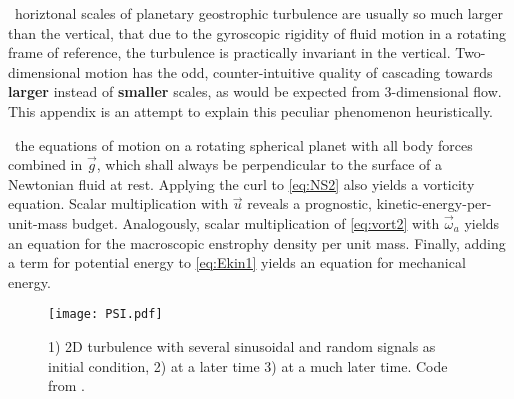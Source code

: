 \label{chap:turbu_categories}
~horiztonal scales of planetary geostrophic turbulence are usually so much
larger than the vertical, that due to the gyroscopic rigidity of fluid motion
in a rotating frame of reference, the turbulence is practically invariant in
the vertical. Two-dimensional motion has the odd, counter-intuitive quality of
cascading towards \textbf{larger} instead of \textbf{smaller} scales, as would be
expected from 3-dimensional flow. This appendix is an attempt to explain
this peculiar phenomenon heuristically.


~the equations of motion on a rotating spherical planet with all body forces
combined in $\vec{g}$, which shall always be perpendicular to
the surface of a Newtonian fluid at rest. Applying the curl to \eqref{eq:NS2}
also yields a vorticity equation.
Scalar multiplication with $\vec{u}$ reveals a prognostic, kinetic-energy-per-unit-mass budget.
Analogously, scalar multiplication of \eqref{eq:vort2} with $\vec{\omega}_{a}$ yields an equation
for the macroscopic enstrophy density per unit mass. Finally, adding a term for potential energy to \eqref{eq:Ekin1} yields an equation for mechanical energy.

\begin{figure}
\texttt{[image: PSI.pdf]}
\caption{1) 2D turbulence with several sinusoidal and random signals as initial condition, 2) at a later time 3) at a much later time. Code from
\citet{Seibold2008a}.}
\label{fig:PSI}
\end{figure}


